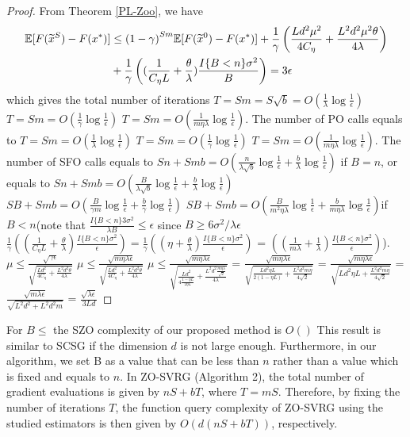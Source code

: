 \documentclass{article}
\newcommand*{\E}{\mathbb{E}}
\theoremstyle{definition}
\theoremstyle{remark}
\begin{document}
\begin{proof}
From Theorem \ref{PL-Zoo}, we have
\begin{align}
\E[F(\widetilde{x}^S) - F(x^*)] & \leq {(1-\gamma)}^{Sm} \E[F(\widetilde{x}^0) - F(x^*)]+\frac{1}{{\gamma}}\left(\frac{Ld^2\mu^2}{4C_{\eta}}+\frac{ L^2d^2\mu^2\theta}{4\lambda}\right)\notag\\
&+ \frac{1}{\gamma}\left((\frac{1}{C_{\eta} L}+\frac{\theta}{\lambda})\frac{I\{B < n\} \sigma ^2}{B}\right)= 3 \epsilon
\end{align}
which gives the total number of iterations $T = Sm = S\sqrt{b} = O(\frac{1}{\lambda}\log\frac{1}{\epsilon})$ {\color{Brown} $T = Sm = O(\frac{1}{\gamma}\log\frac{1}{\epsilon})$} {\color{Blue} $T = Sm = O(\frac{1}{m\eta\lambda}\log\frac{1}{\epsilon})$}. The number of PO calls equals to $T = Sm = O(\frac{1}{\lambda}\log\frac{1}{\epsilon})$ {\color{Brown} $T = Sm = O(\frac{1}{\gamma}\log\frac{1}{\epsilon})$} {\color{Blue} $T = Sm = O(\frac{1}{m\eta\lambda}\log\frac{1}{\epsilon})$}. The number of SFO calls equals to $Sn+Smb = O(\frac{n}{\lambda \sqrt{b}}\log\frac{1}{\epsilon}+\frac{b}{\lambda}\log\frac{1}{\epsilon})$ if $B = n$, or equals to  $Sn+Smb = O(\frac{B}{\lambda \sqrt{b}}\log\frac{1}{\epsilon}+\frac{b}{\lambda}\log\frac{1}{\epsilon})$ {\color{Brown}$SB+Smb = O(\frac{B}{\gamma m}\log\frac{1}{\epsilon}+\frac{b}{\gamma}\log\frac{1}{\epsilon})$} {\color{blue}$SB+Smb = O(\frac{B}{m^2 \eta \lambda}\log\frac{1}{\epsilon}+\frac{b}{m\eta \lambda}\log\frac{1}{\epsilon})$}if $B < n$(note that $\frac{I\{B < n\}3 \sigma ^2}{\lambda B} \leq \epsilon$ since $B \geq 6 {\sigma ^2}/{\lambda \epsilon}$ {\color{Brown}$\frac{1}{\gamma}\left((\frac{1}{C_{\eta} L}+\frac{\theta}{\lambda})\frac{I\{B < n\} \sigma ^2}{\epsilon}\right) = \frac{1}{\gamma}\left((\eta+\frac{\theta}{\lambda})\frac{I\{B < n\} \sigma ^2}{\epsilon}\right) $} = {\color{blue} $\left((\frac{1}{m\lambda}+\frac{1}{\lambda})\frac{I\{B < n\} \sigma ^2}{\epsilon}\right) $}).
{\color{Brown} $\mu \leq \frac{\sqrt{\gamma\epsilon}}{\sqrt{\frac{Ld^2}{4C_{\eta}}+\frac{ L^2d^2\theta}{4\lambda}}}$}{\color{blue} $\mu \leq \frac{\sqrt{m\eta\lambda\epsilon}}{\sqrt{\frac{Ld^2}{4C_{\eta}}+\frac{ L^2d^2\theta}{4\lambda}}}$}{\color{blue} $\mu \leq \frac{\sqrt{m\eta\lambda\epsilon}}{\sqrt{\frac{Ld^2}{4\frac{1-\eta L}{2\eta L}}+\frac{ L^2d^2\frac{m\eta\lambda}{\sqrt{2}}}{4\lambda}}}$ = $\frac{\sqrt{m\eta\lambda\epsilon}}{\sqrt{\frac{Ld^2{\eta L}}{2({1-\eta L})}+\frac{ L^2d^2{m\eta}}{4\sqrt{2}}}}$ = $\frac{\sqrt{m\eta\lambda\epsilon}}{\sqrt{{Ld^2\eta L}+\frac{ L^2d^2{m\eta}}{4\sqrt{2}}}}$ = $\frac{\sqrt{m\lambda\epsilon}}{\sqrt{{L^2d^2}+{ L^2d^2{m}}}}$ = $\frac{\sqrt{\lambda\epsilon}}{3Ld}$}
\end{proof}
For $B \leq $ the SZO complexity of our proposed method is
$O()$ This result is similar to SCSG \cite{} if the dimension $d$ is not large enough. Furthermore, in our algorithm, we set B as a value that can be less than $n$ rather than a value which is fixed and equals to $n$. 
{\color{Brown}
In ZO-SVRG (Algorithm 2), the total number of gradient evaluations is given by $nS + bT$, where $T = mS$. Therefore, by fixing the number of iterations $T$, the function query complexity of ZO-SVRG using the studied estimators is then given by $O(d(nS + bT ))$, respectively.
}
\end{document}
